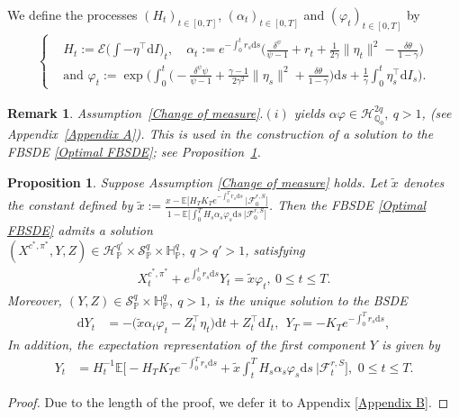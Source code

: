 \documentclass[12,reqno]{amsart}
\numberwithin{equation}{section}
\newtheorem{remark}[defi]{Remark}
\newtheorem{prop}[defi]{Proposition}
\begin{document}
We define the processes $(H_{t})_{t\in[0,T]}$, $(\alpha_{t})_{t\in[0,T]}$ and $(\varphi_{t})_{t\in[0,T]}$ by
\begin{align}\label{Auxiliary processes}
	\begin{cases}
		&H_{t}:=\mathcal{E}\big(\int-\eta^{\top}\mathrm{d}I\big)_{t},\quad\alpha_{t}:=e^{-\int_{0}^{t}r_{s}\mathrm{d}s}\Big(\frac{\delta^{\psi}}{\psi-1}+r_{t}+\frac{1}{2\gamma}\|\eta_{t}\|^{2}-\frac{\delta\theta}{1-\gamma}\Big)\\
		&\text{and }\varphi_{t}:=\exp\Big(\int_{0}^{t}\Big(-\frac{\delta^{\psi}\psi} {\psi-1}+\frac{\gamma-1}{2\gamma^{2}}\|\eta_{s}\|^{2}+\frac{\delta\theta}{1-\gamma}\Big)\mathrm{d}s+\frac{1}{\gamma}\int_{0}^{t}\eta_{s}^{\top}\mathrm{d}I_{s}\Big).
	\end{cases}
\end{align}
\begin{remark}\label{Integrability of alphaphi}
	Assumption~\ref{Change of measure}$.(i)$ yields $\alpha\varphi\in\mathcal{H}_{\mathbb{Q}_{0}}^{2q},~{q>1}$, (see Appendix~\ref{Appendix A}). This is used in the construction of a solution to the FBSDE \eqref{Optimal FBSDE}; see Proposition~\ref{Existence result for the FBSDE}.
\end{remark}
\begin{prop}\label{Existence result for the FBSDE}
	Suppose Assumption \ref{Change of measure} holds. Let $\widetilde{x}$ denotes the constant defined by $\widetilde{x}:=\frac{x-\mathbb{E}\big[H_{T}K_{T}e^{-\int_{0}^{T}r_{s}\mathrm{d}s}~|\mathcal{F}_{0}^{r,S}\big]}{1-\mathbb{E}\big[\int_{0}^{T}H_{s}\alpha_{s}\varphi_{s}\mathrm{d}s~|\mathcal{F}_{0}^{r,S}\big]}$. Then the FBSDE \eqref{Optimal FBSDE} admits a solution\\ $(X^{c^{*},\pi^{*}},Y,Z)\in\mathcal{H}_{\mathbb{P}}^{q'}\times{\mathcal{S}_{\mathbb{P}}^{q}}\times\mathbb{H}_{\mathbb{P}}^{q},~q>q'>1$, satisfying
	\begin{align}\label{Relation between X and Y}
		X_{t}^{c^{*},\pi^{*}}+e^{\int_{0}^{t}r_{s}\mathrm{d}s}Y_{t}=\widetilde{x}\varphi_{t},~0\le t\le T.
	\end{align}
	Moreover, $(Y,Z)\in{\mathcal{S}_{\mathbb{P}}^{q}}\times\mathbb{H}_{\mathbb{P}}^{q},~{q>1}$, is the unique solution to the BSDE
	\begin{align}\label{Auxiliary BSDE_Investor}
		\mathrm{d}Y_{t}&=-\Big(\widetilde{x}\alpha_{t}\varphi_{t}-Z_{t}^{\top}\eta_{t}\Big)\mathrm{d}t+Z_{t}^{\top}\mathrm{d}I_{t},~~Y_{T}=-K_{T}e^{-\int_{0}^{T}r_{s}\mathrm{d}s},
	\end{align}
	In addition, the expectation representation of the first component $Y$ is given by
	\begin{align}\label{YSolution to the BSDE}
		Y_{t}&=H_{t}^{-1}\mathbb{E}\Big[-H_{T}K_{T}e^{-\int_{0}^{T}r_{s}\mathrm{d}s}+\widetilde{x}\int_{t}^{T}H_{s}\alpha_{s}\varphi_{s}\mathrm{d}s~\big|\mathcal{F}_{t}^{r,S}\Big],\,\,0\le t\le T.
	\end{align}
\end{prop}
\begin{proof}
	Due to the length of the proof, we defer it to Appendix \ref{Appendix B}.
\end{proof}
\end{document}
